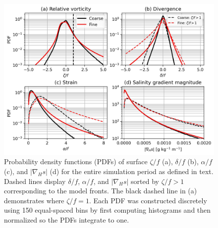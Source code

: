 \begin{figure}[ht] 
 \centerline{\includegraphics[width = \linewidth]{figures/james_2023/Figure3_surface_pdfs.jpg}}
  \caption{Probability density functions (PDFs) of surface $\zeta/f$ (a), $\delta/f$ (b), $\alpha/f$ (c), and $|\nabla_H s|$ (d) for the entire simulation period as defined in text. Dashed lines display $\delta/f$, $\alpha/f$, and $|\nabla_H s|$ sorted by $\zeta/f>1$ corresponding to the model fronts. The black dashed line in (a) demonstrates where $\zeta/f=1$. Each PDF was constructed discretely using 150 equal-spaced bins by first computing histograms and then normalized so the PDFs integrate to one.}
  \label{fig:surface_pdfs}
\end{figure}

